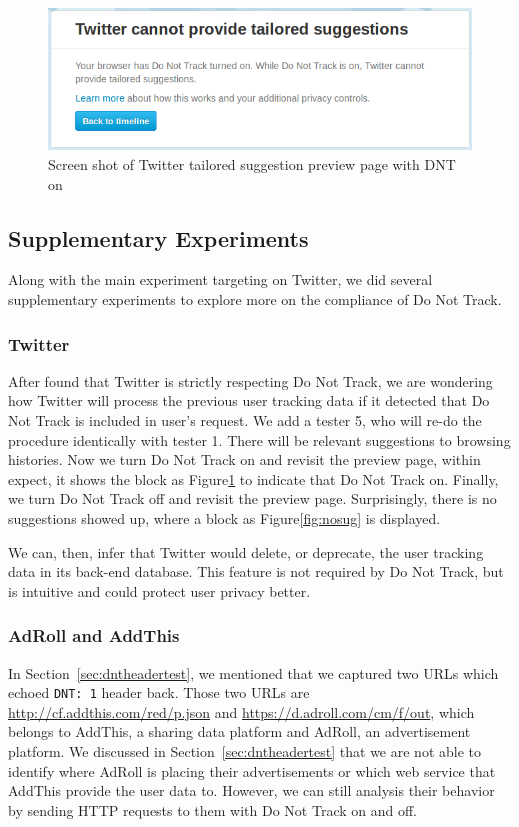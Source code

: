 \documentclass{sig-alternate}
\begin{document}
\begin{figure}
\begin{center}
\includegraphics[width=0.9\columnwidth]{dnton}
\end{center}
\caption{Screen shot of Twitter tailored suggestion preview page with DNT on}
\label{fig:dnton}
\end{figure}

\subsection{Supplementary Experiments} \label{sec:supplement}
Along with the main experiment targeting on Twitter, we did several supplementary experiments to explore more on the compliance of Do Not Track.

\subsubsection{Twitter}
After found that Twitter is strictly respecting Do Not Track, we are wondering how Twitter will process the previous user tracking data if it detected that Do Not Track is included in user's request. We add a tester 5, who will re-do the procedure identically with tester 1. There will be relevant suggestions to browsing histories. Now we turn Do Not Track on and revisit the preview page, within expect, it shows the block as Figure\ref{fig:dnton} to indicate that Do Not Track on. Finally, we turn Do Not Track off and revisit the preview page. Surprisingly, there is no suggestions showed up, where a block as Figure\ref{fig:nosug} is displayed. 

We can, then, infer that Twitter would delete, or deprecate, the user tracking data in its back-end database. This feature is not required by Do Not Track, but is intuitive and could protect user privacy better.

\subsubsection{AdRoll and AddThis}

In Section~\ref{sec:dntheadertest}, we mentioned that we captured two URLs which echoed \verb|DNT: 1| header back. Those two URLs are \url{http://cf.addthis.com/red/p.json} and \url{https://d.adroll.com/cm/f/out}, which belongs to AddThis, a sharing data platform and AdRoll, an advertisement platform. We discussed in Section~\ref{sec:dntheadertest} that we are not able to identify where AdRoll is placing their advertisements or which web service that AddThis provide the user data to. However, we can still analysis their behavior by sending HTTP requests to them with Do Not Track on and off.
\end{document}
